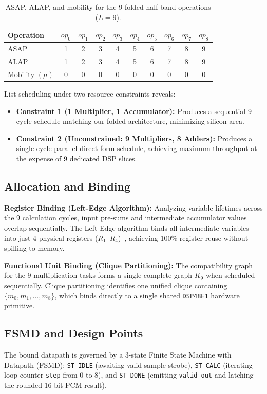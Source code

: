 \documentclass[11pt,a4paper]{article}
\begin{document}
\begin{table}[H]\centering\small
\caption{ASAP, ALAP, and mobility for the 9 folded half-band operations ($L=9$).}\label{tab:scheduling}
\begin{tabular}{@{}lccccccccc@{}}
\toprule
Operation & $op_0$ & $op_1$ & $op_2$ & $op_3$ & $op_4$ & $op_5$ & $op_6$ & $op_7$ & $op_8$\\
\midrule
$\text{ASAP}$ & 1 & 2 & 3 & 4 & 5 & 6 & 7 & 8 & 9\\
$\text{ALAP}$ & 1 & 2 & 3 & 4 & 5 & 6 & 7 & 8 & 9\\
$\text{Mobility } (\mu)$ & 0 & 0 & 0 & 0 & 0 & 0 & 0 & 0 & 0\\
\bottomrule
\end{tabular}
\end{table}

List scheduling under two resource constraints reveals:
\begin{itemize}
  \item \textbf{Constraint 1 (1 Multiplier, 1 Accumulator):} Produces a sequential 9-cycle schedule matching our folded architecture, minimizing silicon area.
  \item \textbf{Constraint 2 (Unconstrained: 9 Multipliers, 8 Adders):} Produces a single-cycle parallel direct-form schedule, achieving maximum throughput at the expense of 9 dedicated DSP slices.
\end{itemize}

\subsection{Allocation and Binding}
\textbf{Register Binding (Left-Edge Algorithm):} Analyzing variable lifetimes across the 9 calculation cycles, input pre-sums and intermediate accumulator values overlap sequentially. The Left-Edge algorithm binds all intermediate variables into just 4 physical registers ($R_1$--$R_4$)~\cite{demicheli1994}, achieving 100\% register reuse without spilling to memory.

\textbf{Functional Unit Binding (Clique Partitioning):} The compatibility graph for the 9 multiplication tasks forms a single complete graph $K_9$ when scheduled sequentially. Clique partitioning identifies one unified clique containing $\{m_0, m_1, \dots, m_8\}$, which binds directly to a single shared \texttt{DSP48E1} hardware primitive.

\subsection{FSMD and Design Points}
The bound datapath is governed by a 3-state Finite State Machine with Datapath (FSMD): \texttt{ST\_IDLE} (awaiting valid sample strobe), \texttt{ST\_CALC} (iterating loop counter \texttt{step} from 0 to 8), and \texttt{ST\_DONE} (emitting \texttt{valid\_out} and latching the rounded 16-bit PCM result). 
\end{document}
